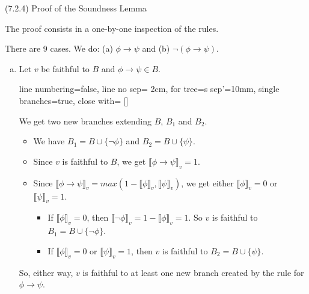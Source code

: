 \documentclass[../slides.tex]{subfiles}
\begin{document}
\begin{frame}{(7.2.4)  Proof of the Soundness Lemma}

The proof consists in a one-by-one inspection of the rules.

There are 9 cases. We do: (a) $\phi\to\psi$ and (b) $\neg(\phi\to \psi)$.
		
		\begin{enumerate}[(a)]
					
		\item Let $v$ be faithful to $B$ and $\phi\to\psi\in B$.
		
					\begin{center}
					\begin{prooftree}
					{
					line numbering=false,
					line no sep= 2cm,
					for tree={s sep'=10mm},
					single branches=true,
					close with=\xmark
					}
					[\phi\to\psi [\neg \phi ] [\psi ] ]
					\end{prooftree}
					\end{center}
					
			We get two new branches extending $B$, $B_1$ and $B_2$. 
			
			\begin{itemize}
						
			\item We have $B_1=B\cup\{\neg\phi\}$ and $B_2=B\cup\{\psi\}$. 
			
			\item Since $v$ is faithful to $B$, we get $\llbracket\phi\to\psi\rrbracket_v=1$. 
			
			\item Since $\llbracket\phi\to\psi\rrbracket_v=max(1-\llbracket\phi\rrbracket_v,\llbracket\psi\rrbracket_v)$, we get either $\llbracket\phi\rrbracket_v=0$ or $\llbracket\psi\rrbracket_v=1$.
			
			\begin{itemize}
		
			\item If $\llbracket\phi\rrbracket_v=0$, then $\llbracket\neg\phi\rrbracket_v=1-\llbracket\phi\rrbracket_v=1$. So $v$ is faithful to $B_1=B\cup\{\neg\phi\}$. 
		
			\item If $\llbracket\phi\rrbracket_v=0$ or $\llbracket\psi\rrbracket_v=1$, then $v$ is faithful to $B_2=B\cup\{\psi\}$. 
	
		
			\end{itemize}
		
		\end{itemize}
	So, either way, $v$ is faithful to at least one new branch created by the rule for $\phi\to\psi$.
	
	\end{enumerate}
	
\end{frame}
\end{document}
